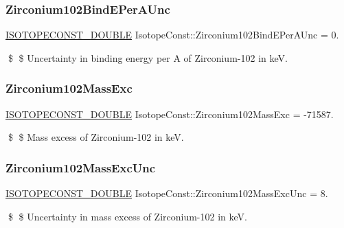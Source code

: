 \subsubsection{\texorpdfstring{Zirconium102\+Bind\+E\+Per\+A\+Unc}{Zirconium102BindEPerAUnc}}
{\footnotesize\ttfamily \mbox{\hyperlink{group___isotope_const-_macros_ga8f45a7272ce02c0b4c65c44636ed719a}{I\+S\+O\+T\+O\+P\+E\+C\+O\+N\+S\+T\+\_\+\+D\+O\+U\+B\+LE}} Isotope\+Const\+::\+Zirconium102\+Bind\+E\+Per\+A\+Unc = 0.}

\$ \$ Uncertainty in binding energy per A of Zirconium-\/102 in keV. \mbox{\label{group___isotope_const-_zirconium-_zr102_ga56216cb0dbc53b3847404fdcf24250de}} 
\subsubsection{\texorpdfstring{Zirconium102\+Mass\+Exc}{Zirconium102MassExc}}
{\footnotesize\ttfamily \mbox{\hyperlink{group___isotope_const-_macros_ga8f45a7272ce02c0b4c65c44636ed719a}{I\+S\+O\+T\+O\+P\+E\+C\+O\+N\+S\+T\+\_\+\+D\+O\+U\+B\+LE}} Isotope\+Const\+::\+Zirconium102\+Mass\+Exc = -\/71587.}

\$ \$ Mass excess of Zirconium-\/102 in keV. \mbox{\label{group___isotope_const-_zirconium-_zr102_ga4437ad94a23d7fdfc1ee816f39ae94a2}} 
\subsubsection{\texorpdfstring{Zirconium102\+Mass\+Exc\+Unc}{Zirconium102MassExcUnc}}
{\footnotesize\ttfamily \mbox{\hyperlink{group___isotope_const-_macros_ga8f45a7272ce02c0b4c65c44636ed719a}{I\+S\+O\+T\+O\+P\+E\+C\+O\+N\+S\+T\+\_\+\+D\+O\+U\+B\+LE}} Isotope\+Const\+::\+Zirconium102\+Mass\+Exc\+Unc = 8.}

\$ \$ Uncertainty in mass excess of Zirconium-\/102 in keV. \mbox{\label{group___isotope_const-_zirconium-_zr102_ga544e80a8b6996766583acc30407a1fa5}} 
